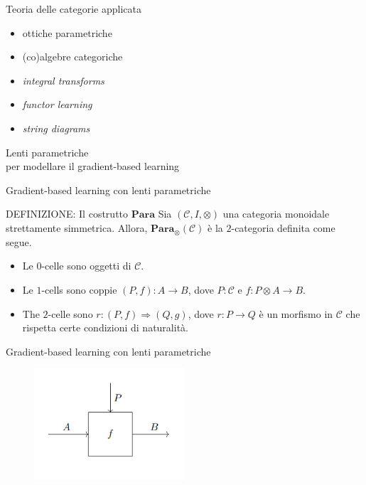 \documentclass{beamer}
\begin{document}
\begin{frame}{Teoria delle categorie applicata}
    \begin{itemize}
        \item<1-> ottiche parametriche
        \item<2-> (co)algebre categoriche
        \item<3-> \textit{integral transforms}
        \item<4-> \textit{functor learning}
        \item<5-> \textit{string diagrams}
    \end{itemize}
\end{frame}

\begin{frame}[standout]
    \huge Lenti parametriche \\\large per modellare il gradient-based learning
\end{frame}

\begin{frame}{Gradient-based learning con lenti parametriche}
    \begin{block}{DEFINIZIONE: Il costrutto $\mathbf{Para}$}
        Sia $(\mathcal{C},I,\otimes)$ una categoria monoidale strettamente simmetrica. Allora, $\mathbf{Para}_{\otimes}(\mathcal{C})$ è la $2$-categoria definita come segue.
        \begin{itemize}
          \item Le $0$-celle sono oggetti di $\mathcal{C}$.
          \item Le $1$-cells sono coppie $(P,f): A \to B$, dove $P : \mathcal{C}$ e $f: P \otimes A \to B$.
          \item The $2$-celle sono $r: (P,f) \Rightarrow (Q,g)$, dove $r: P \to Q$ è un morfismo in $\mathcal{C}$ che rispetta certe condizioni di naturalità.
        \end{itemize}
      \end{block}
\end{frame}

\begin{frame}{Gradient-based learning con lenti parametriche}
    \begin{figure}
        \begin{center}
            \includegraphics[width=0.5\textwidth]{figures/para.png}
            \caption*{}
        \end{center}
    \end{figure}
\end{frame}
\end{document}
